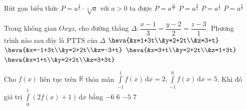 \begin{ex}%
Rút gọn biểu thức $P=a^\frac{3}{2}\cdot\sqrt[3]{a}$ với $a>0$ ta được
\choice
{\True $P=a^{\frac{11}{6}}$}
{$P=a^{\frac{9}{2}}$}
{$P=a^{\frac{1}{2}}$}
{$P=a^{\frac{7}{6}}$}
\end{ex}

\begin{ex}%
Trong không gian $Oxyz$, cho đường thẳng $\Delta\colon \dfrac{x-1}{3}=\dfrac{y-2}{2}=\dfrac{z-3}{1}$. Phương trình nào sau đây là PTTS của $\Delta$
\choice
{\True $\heva{&x=1+3t\\&y=2+2t\\&z=3+t}$}
{$\heva{&x=-1+3t\\&y=2+2t\\&z=-3+t}$}
{$\heva{&x=3+t\\&y=2+2t\\&z=1+3t}$}
{$\heva{&x=1+t\\&y=2+2t\\&z=3+3t}$}
\end{ex}

\begin{ex}%
Cho $f(x)$ liên tục trên $\mathbb{R}$ thỏa mãn $\displaystyle\int\limits_{-1}^1f(x) \mathrm{\,d}x=2, \displaystyle\int\limits_{-1}^0f(x) \mathrm{\,d}x=5$. Khi đó giá trị $\displaystyle\int\limits_0^1(2 f(x)+1) \mathrm{\,d}x$ bằng
\choice
{$-6$}
{$6$}
{\True $-5$}
{$7$}
\end{ex}

